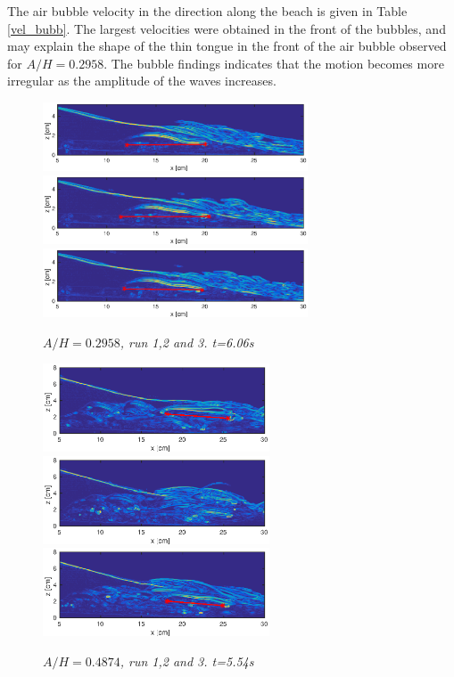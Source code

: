 \documentclass[review]{elsarticle}
\begin{document}
The air bubble velocity in the direction along the beach is given in Table \ref{vel_bubb}. The largest velocities were obtained in the front of the bubbles, and may explain the shape of the thin tongue in the front of the air bubble observed for $A/H=0.2958$. The bubble findings indicates that the motion becomes more irregular as the amplitude of the waves increases.
\begin{figure}[]
\centering
\includegraphics[width=0.7\textwidth]{./Figures/BUBBLE/bubble_30_run1.eps}
\includegraphics[width=0.7\textwidth]{./Figures/BUBBLE/bubble_30_run2.eps}
\includegraphics[width=0.7\textwidth]{./Figures/BUBBLE/bubble_30_run3.eps}
\caption{\textit{$A/H=0.2958$, run 1,2 and 3. t=6.06s}}
\label{fig:bubble_30}
\end{figure}

\begin{figure}[]
\centering
\includegraphics[width=0.6\textwidth]{./Figures/BUBBLE/bubble_50_run1.eps}
\includegraphics[width=0.6\textwidth]{./Figures/BUBBLE/bubble_50_run2.eps}
\includegraphics[width=0.6\textwidth]{./Figures/BUBBLE/bubble_50_run3.eps}
\caption{\textit{$A/H=0.4874$, run 1,2 and 3. t=5.54s}}
\label{fig:bubble_50}
\end{figure} 
\end{document}

